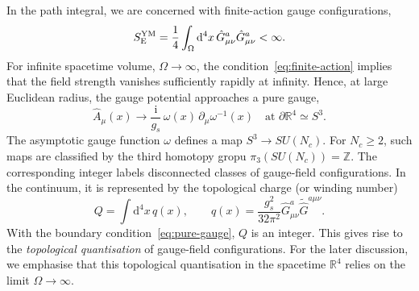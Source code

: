 \documentclass[review]{elsarticle}
\numberwithin{equation}{section}
\numberwithin{table}{section}
\numberwithin{figure}{section}
\def\d{\mathrm{d}}
\def\i{\mathrm{i}}
\begin{document}
In the path integral, we are concerned with finite-action gauge configurations,
\begin{equation}
    S_{\rm E}^{\rm YM} = \frac{1}{4}\int_\Omega \d^4x\,\hat{G}^a_{\mu\nu}\hat{G}^a_{\mu\nu} < \infty.
    \label{eq:finite-action}
\end{equation}
For infinite spacetime volume, $\Omega\rightarrow\infty$, the condition~\eqref{eq:finite-action} implies that the field strength vanishes sufficiently rapidly at infinity. Hence, at large Euclidean radius, the gauge potential approaches a pure gauge,
\begin{equation}
    \hat{A}_\mu(x) \rightarrow \frac{\i}{g_s}\,\omega(x)\,\partial_\mu\omega^{-1}(x)
    \quad
    \text{at } \partial\mathbb{R}^4\simeq S^3.
    \label{eq:pure-gauge}
\end{equation}
The asymptotic gauge function $\omega$ defines a map $S^3\rightarrow SU(N_c)$. For $N_c\geq2$, such maps are classified by the third homotopy gropu $\pi_3(SU(N_c))=\mathbb{Z}$.
The corresponding integer labels disconnected classes of gauge-field configurations. In the continuum, it is represented by the topological charge (or winding number)
\begin{equation}
    Q = \int \d^4x\,q(x),
    \qquad 
    q(x)=\frac{g_s^2}{32\pi^2} \hat{G}^a_{\mu\nu} \widetilde{\hat{G}}^{a\mu\nu}.
    \label{eq:topological-charge}
\end{equation}
With the boundary condition~\eqref{eq:pure-gauge}, $Q$ is an integer. This gives rise to the {\it topological quantisation} of gauge-field configurations. For the later discussion, we emphasise that this topological quantisation in the spacetime $\mathbb R^4$ relies on the limit $\Omega\rightarrow\infty$.
\end{document}
